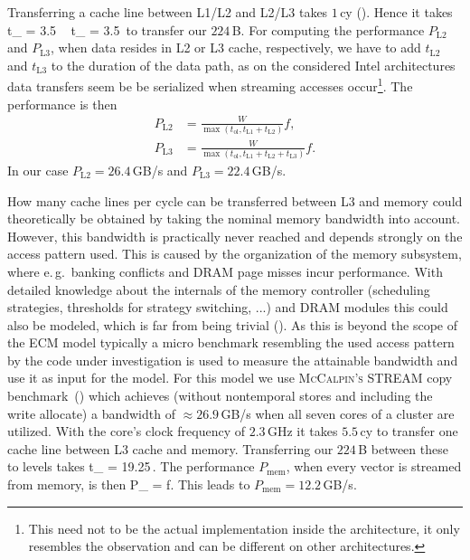Transferring a cache line between L1/L2 and L2/L3 takes $1$\,cy (\cite{intel-orm-2016}). Hence it takes
%
\be
  t_ = 3.5\,\cyw\ \ t_ = 3.5\,\cyw
\ee
%
to transfer our $224$\,B.
For computing the performance $P_\text{L2}$ and $P_\text{L3}$, when data resides
in L2 or L3 cache, respectively, we
have to add $t_\text{L2}$ and $t_\text{L3}$ to the duration of the data path, as on the considered
Intel architectures data transfers seem be be serialized when streaming accesses
occur\footnote{This need not to be the actual implementation inside the
architecture, it only resembles the observation and can be different on other
architectures.}.
The performance is then
%
\begin{align}
  P_\text{L2} &= \frac{W}{\max(t_\text{ol}, t_\text{L1} + t_\text{L2})} f, \\
  P_\text{L3} &= \frac{W}{\max(t_\text{ol}, t_\text{L1} + t_\text{L2} +
t_\text{L3})} f.
\end{align}
%
In our case $P_\text{L2} = 26.4$\,GB/s and $P_\text{L3} = 22.4$\,GB/s.
%

How many cache lines per cycle can be transferred between L3 and memory could
theoretically be obtained by taking the nominal memory bandwidth into account.
However, this bandwidth is practically never reached and depends strongly on the
access pattern used.
This is caused by the organization of the memory subsystem, where e.\,g.\ banking
conflicts and DRAM page misses incur performance.
With detailed knowledge about the internals of the memory controller
(scheduling strategies, thresholds for strategy switching, ...) and DRAM modules
this could also be modeled, which is far from being trivial (\cite{jacob-2007}).
As this is beyond the scope of the ECM model typically a micro benchmark
resembling the used access pattern by the code under investigation is used
to measure the attainable bandwidth and use it as input for the model.
%
For this model we use \textsc{McCalpin's} STREAM copy
benchmark~(\cite{mccalpin-1995}) which achieves (without nontemporal stores and
including the write allocate) a bandwidth of $\approx 26.9$\,GB/s when all seven cores
of a cluster are utilized.
With the core's clock frequency of $2.3$\,GHz it takes $5.5$\,cy to transfer one
cache line between L3 cache and memory.
Transferring our $224$\,B between these to levels takes
%
\be
  t_ = 19.25\,\cyw.
\ee
%
The performance $P_\text{mem}$, when every vector is streamed from memory, is then
%
\be
  P_ =  f.
\ee
%
This leads to $P_\text{mem} = 12.2$\,GB/s. 

